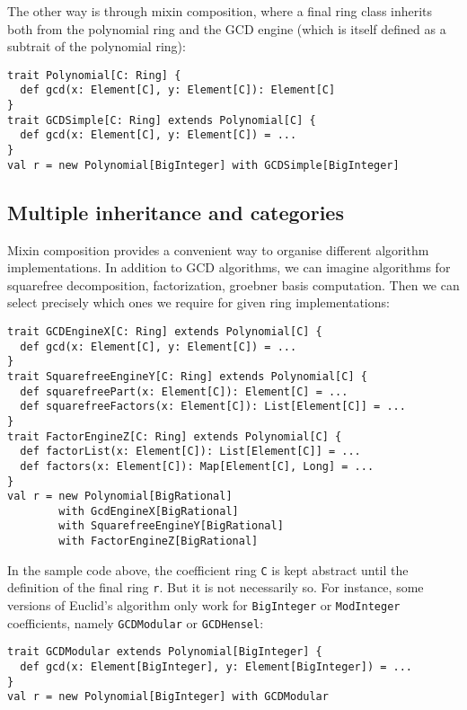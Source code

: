 \documentclass{llncs}
\newcommand{\code}[1]{\texttt{#1}}
\begin{document}
The other way is through mixin composition, where a final ring class inherits
both from the polynomial ring and the GCD engine (which is itself defined as a
subtrait of the polynomial ring):

\begin{verbatim}
trait Polynomial[C: Ring] {
  def gcd(x: Element[C], y: Element[C]): Element[C]
}
trait GCDSimple[C: Ring] extends Polynomial[C] {
  def gcd(x: Element[C], y: Element[C]) = ...
}
val r = new Polynomial[BigInteger] with GCDSimple[BigInteger]
\end{verbatim}

\subsection{Multiple inheritance and categories} %

Mixin composition provides a convenient way to organise different algorithm
implementations. In addition to GCD algorithms, we can imagine algorithms for
squarefree decomposition, factorization, groebner basis computation. Then we
can select precisely which ones we require for given ring implementations:

\begin{verbatim}
trait GCDEngineX[C: Ring] extends Polynomial[C] {
  def gcd(x: Element[C], y: Element[C]) = ...
}
trait SquarefreeEngineY[C: Ring] extends Polynomial[C] {
  def squarefreePart(x: Element[C]): Element[C] = ...
  def squarefreeFactors(x: Element[C]): List[Element[C]] = ...
}
trait FactorEngineZ[C: Ring] extends Polynomial[C] {
  def factorList(x: Element[C]): List[Element[C]] = ...
  def factors(x: Element[C]): Map[Element[C], Long] = ...
}
val r = new Polynomial[BigRational]
        with GcdEngineX[BigRational] 
        with SquarefreeEngineY[BigRational]
        with FactorEngineZ[BigRational]
\end{verbatim}

In the sample code above, the coefficient ring \code{C} is kept abstract until
the definition of the final ring \code{r}. But it is not necessarily so. For
instance, some versions of Euclid's algorithm only work for \code{BigInteger}
or \code{ModInteger} coefficients, namely \code{GCDModular} or
\code{GCDHensel}:

\begin{verbatim}
trait GCDModular extends Polynomial[BigInteger] {
  def gcd(x: Element[BigInteger], y: Element[BigInteger]) = ...
}
val r = new Polynomial[BigInteger] with GCDModular
\end{verbatim}
\end{document}
